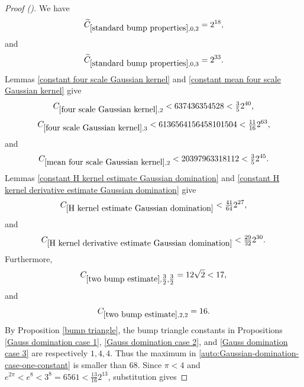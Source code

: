 \documentclass[12pt,reqno]{amsart}
\newcommand{\auto}{{({\tiny\faCar})}}
\theoremstyle{plain}
\numberwithin{equation}{section}
\theoremstyle{remark}
\begin{document}
\begin{proof}[Proof \auto]
We have
\begin{equation}\label{auto:standard-bump-small-constants-for-Gaussian-domination}
\widetilde C_{\ref{standard bump properties},0,2}=2^{18},
\end{equation}
and
\begin{equation}\label{auto:standard-bump-small-constant-three-for-Gaussian-domination}
\widetilde C_{\ref{standard bump properties},0,3}=2^{33}.
\end{equation}
Lemmas \ref{constant four scale Gaussian kernel} and \ref{constant mean four scale Gaussian kernel} give
\begin{equation}\label{auto:four-scale-small-constant-two-for-Gaussian-domination}
C_{\ref{four scale Gaussian kernel},2}<637436354528<\tfrac35 2^{40},
\end{equation}
\begin{equation}\label{auto:four-scale-small-constant-three-for-Gaussian-domination}
C_{\ref{four scale Gaussian kernel},3}<6136564156458101504<\tfrac{11}{16}2^{63},
\end{equation}
and
\begin{equation}\label{auto:mean-four-scale-small-constant-two-for-Gaussian-domination}
C_{\ref{mean four scale Gaussian kernel},2}<20397963318112<\tfrac35 2^{45}.
\end{equation}
Lemmas \ref{constant H kernel estimate Gaussian domination} and \ref{constant H kernel derivative estimate Gaussian domination} give
\begin{equation}\label{auto:H-kernel-small-constant-for-Gaussian-domination}
C_{\ref{H kernel estimate Gaussian domination}}<\tfrac{41}{64}2^{27},
\end{equation}
and
\begin{equation}\label{auto:H-kernel-derivative-small-constant-for-Gaussian-domination}
C_{\ref{H kernel derivative estimate Gaussian domination}}<\tfrac{29}{32}2^{30}.
\end{equation}
Furthermore,
\begin{equation}\label{auto:two-bump-small-constant-three-halves-for-Gaussian-domination}
C_{\ref{two bump estimate},\tfrac32,\tfrac32}=12\sqrt2<17,
\end{equation}
and
\begin{equation}\label{auto:two-bump-small-constant-two-for-Gaussian-domination}
C_{\ref{two bump estimate},2,2}=16.
\end{equation}
By Proposition \ref{bump triangle}, the bump triangle constants in Propositions \ref{Gauss domination case 1}, \ref{Gauss domination case 2}, and \ref{Gauss domination case 3} are respectively $1,4,4$. Thus the maximum in \eqref{auto:Gaussian-domination-case-one-constant} is smaller than $68$. Since $\pi<4$ and $e^{2\pi}<e^8<3^8=6561<\frac{13}{16}2^{13}$, substitution gives

\end{proof}
\end{document}
